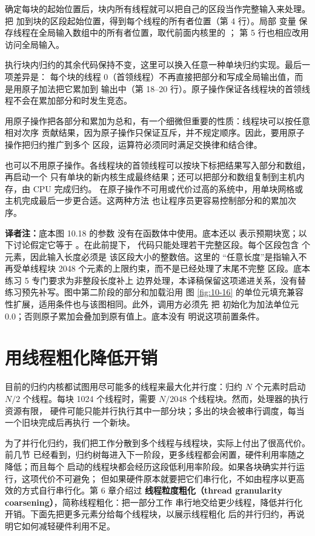 确定每块的起始位置后，块内所有线程就可以把自己的区段当作完整输入来处理。把
 加到块的区段起始位置，得到每个线程的所有者位置（第 4 行）。局部
变量  保存线程在全局输入数组中的所有者位置，取代前面内核里的 ；
第 5 行也相应改用  访问全局输入。

执行块内归约的其余代码保持不变，这里可以换入任意一种单块归约实现。最后一项差异是：
每个块的线程 0（首领线程）不再直接把部分和写成全局输出值，而是用原子加法把它累加到
输出中（第 18--20 行）。原子操作保证各线程块的首领线程不会在累加部分和时发生竞态。

用原子操作把各部分和累加为总和，有一个细微但重要的性质：线程块可以按任意相对次序
贡献结果，因为原子操作只保证互斥，并不规定顺序。因此，要用原子操作把归约推广到多个
区段，运算符必须同时满足交换律和结合律。

也可以不用原子操作。各线程块的首领线程可以按块下标把结果写入部分和数组，再启动一个
只有单块的新内核生成最终结果；还可以把部分和数组复制到主机内存，由 CPU 完成归约。
在原子操作不可用或代价过高的系统中，用单块网格或主机完成最后一步更合适。这两种方法
也让程序员更容易控制部分和的累加次序。

\noindent\textbf{译者注：}底本图 10.18 的参数  没有在函数体中使用。底本还以
 表示预期块宽；以下讨论假定它等于 。在此前提下，
代码只能处理若干完整区段。每个区段包含  个元素，因此输入长度必须是
该区段大小的整数倍。这里的
“任意长度”是指输入不再受单线程块 2048 个元素的上限约束，而不是已经处理了末尾不完整
区段。底本练习 5 专门要求为非整段长度补上
边界处理，本译稿保留这项递进关系，没有替练习预先补写。图中第二阶段的部分和加载沿用
图 \ref{fig:10-16} 的单位元填充兼容性扩展，适用条件也与该图相同。此外，调用方必须先
把  初始化为加法单位元 $0.0$；否则原子累加会叠加到原有值上。底本没有
明说这项前置条件。

\section{用线程粗化降低开销}
\label{sec:reduction-thread-coarsening}

目前的归约内核都试图用尽可能多的线程来最大化并行度：归约 $N$ 个元素时启动 $N/2$
个线程。每块 1024 个线程时，需要 $N/2048$ 个线程块。然而，处理器的执行资源有限，
硬件可能只能并行执行其中一部分块；多出的块会被串行调度，每当一个旧块完成后再执行
一个新块。

为了并行化归约，我们把工作分散到多个线程与线程块，实际上付出了很高代价。前几节
已经看到，归约树每进入下一阶段，更多线程都会闲置，硬件利用率随之降低；而且每个
启动的线程块都会经历这段低利用率阶段。如果各块确实并行运行，这项代价不可避免；
但如果硬件原本就要把它们串行化，不如由程序以更高效的方式自行串行化。第 6 章介绍过
\textbf{线程粒度粗化（thread granularity coarsening）}，简称线程粗化：把一部分工作
串行地交给更少线程，降低并行化开销。下面先把更多元素分给每个线程块，以展示线程粗化
后的并行归约，再说明它如何减轻硬件利用不足。

